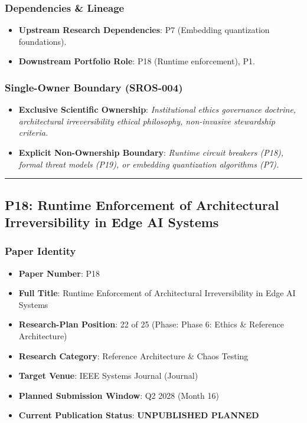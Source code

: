 \documentclass[11pt,letterpaper]{article}
\begin{document}
\subsubsection{Dependencies \& Lineage}
\begin{itemize}[leftmargin=*]
    \item \textbf{Upstream Research Dependencies}: P7 (Embedding quantization foundations).
    \item \textbf{Downstream Portfolio Role}: P18 (Runtime enforcement), P1.
\end{itemize}

\subsubsection{Single-Owner Boundary (SROS-004)}
\begin{itemize}[leftmargin=*]
    \item \textbf{Exclusive Scientific Ownership}: \textit{Institutional ethics governance doctrine, architectural irreversibility ethical philosophy, non-\allowbreak invasive stewardship criteria.}
    \item \textbf{Explicit Non-Ownership Boundary}: \textit{Runtime circuit breakers (P18), formal threat models (P19), or embedding quantization algorithms (P7).}
\end{itemize}

\vspace{0.4cm}
\hrule

\subsection{P18: Runtime Enforcement of Architectural Irreversibility in Edge AI Systems}
\label{sec:profile_p18}

\subsubsection{Paper Identity}
\begin{itemize}[leftmargin=*]
    \item \textbf{Paper Number}: P18
    \item \textbf{Full Title}: Runtime Enforcement of Architectural Irreversibility in Edge AI Systems
    \item \textbf{Research-Plan Position}: 22 of 25 (Phase: Phase 6: Ethics \& Reference Architecture)
    \item \textbf{Research Category}: Reference Architecture \& Chaos Testing
    \item \textbf{Target Venue}: IEEE Systems Journal (Journal)
    \item \textbf{Planned Submission Window}: Q2 2028 (Month 16)
    \item \textbf{Current Publication Status}: \textbf{UNPUBLISHED PLANNED}
\end{itemize}
\end{document}
